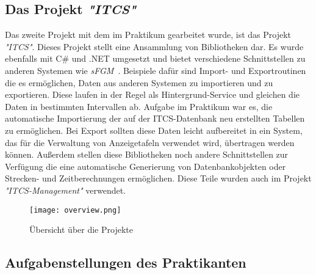 \subsection{Das Projekt \emph{"ITCS"}}\label{sec:itcs}
    Das zweite Projekt mit dem im Praktikum gearbeitet wurde, ist das Projekt \emph{"ITCS"}. Dieses Projekt stellt eine Ansammlung von Bibliotheken dar.
    Es wurde ebenfalls mit C\# und .NET umgesetzt und bietet verschiedene Schnittstellen zu anderen Systemen wie \emph{sFGM}~\cite{sFGM}.
    Beispiele dafür sind Import- und Exportroutinen die es ermöglichen, Daten aus anderen Systemen zu importieren und zu exportieren. Diese laufen in der Regel als Hintergrund-Service und gleichen die Daten in
    bestimmten Intervallen ab. Aufgabe im Praktikum war es, die automatische 
    Importierung der auf der ITCS-Datenbank neu erstellten Tabellen zu ermöglichen. Bei Export sollten diese Daten leicht aufbereitet in ein System, das für die Verwaltung von 
    Anzeigetafeln verwendet wird, übertragen werden können. Außerdem stellen diese Bibliotheken noch andere Schnittstellen zur Verfügung die eine automatische Generierung
    von Datenbankobjekten oder Strecken- und Zeitberechnungen ermöglichen. Diese Teile wurden auch im Projekt \emph{"ITCS-Management"} verwendet.
    \begin{figure}[H]
        \centering
        \texttt{[image: overview.png]}
        \caption{Übersicht über die Projekte}
        \label{fig:VTs}
    \end{figure}

\subsection{Aufgabenstellungen des Praktikanten}\label{sec:aufgabenstellung-praktikant}

